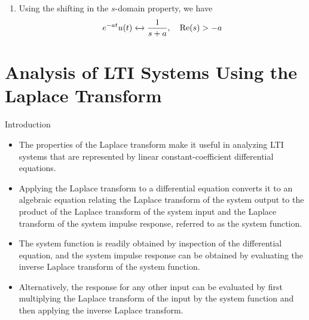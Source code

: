 \begin{frame}[allowframebreaks]{}
{\begin{enumerate}
              \begin{align*}
                tu(t) &\xleftrightarrow{}  -\frac{d}{ds}\left(\frac{1}{s}\right) = \frac{1}{s^2}, \quad \mathrm{Re}(s)>0\\
              \end{align*}
              \pause
          \item Using the shifting in the $s$-domain property, we have
              \begin{align*}
                e^{-at}u(t) &\xleftrightarrow{}  \frac{1}{s+a}, \quad \mathrm{Re}(s)>-a\\
              \end{align*}
        \end{enumerate}

    }
\end{frame}



\section{Analysis of LTI Systems Using the Laplace Transform}

\begin{frame}{Introduction}
    \begin{itemize}
        \item The properties of the Laplace transform make it useful in analyzing LTI systems that are represented by linear constant-coefficient differential equations.
        \item Applying the Laplace transform to a differential equation converts it to an algebraic equation relating the Laplace transform of the system output to the product of the Laplace transform of the system input and the Laplace transform of the system impulse response, referred to as the system function.
        \item The system function is readily obtained by inspection of the differential equation, and the system impulse response can be obtained by evaluating the inverse Laplace transform of the system function.
        \item Alternatively, the response for any other input can be evaluated by first multiplying the Laplace transform of the input by the system function and then applying the inverse Laplace transform.
    \end{itemize}
\end{frame}

